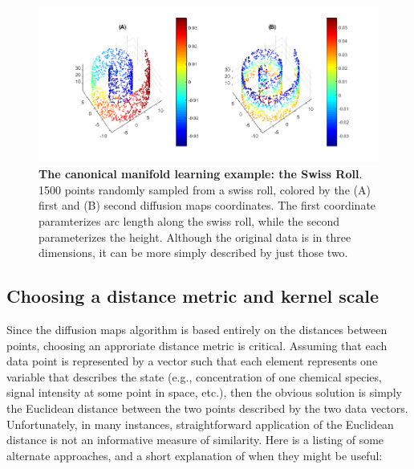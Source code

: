 \documentclass[12pt]{article}
\begin{document}
\begin{figure}[here]
\includegraphics[width=\linewidth]{figures/swissroll}
\caption{\textbf{The canonical manifold learning example: the Swiss Roll}. 1500 points randomly sampled from a swiss roll, colored by the (A) first and (B) second diffusion maps coordinates. The first coordinate paramterizes arc length along the swiss roll, while the second parameterizes the height. Although the original data is in three dimensions, it can be more simply described by just those two.}
\label{fig:sr}
\end{figure}

\subsection{Choosing a distance metric and kernel scale}

Since the diffusion maps algorithm is based entirely on the distances between points, choosing an approriate distance metric is critical. Assuming that each data point is represented by a vector such that each element represents one variable that describes the state (e.g., concentration of one chemical species, signal intensity at some point in space, etc.), then the obvious solution is simply the Euclidean distance between the two points described by the two data vectors. Unfortunately, in many instances, straightforward application of the Euclidean distance is not an informative measure of similarity. Here is a listing of some alternate approaches, and a short explanation of when they might be useful:
\end{document}
